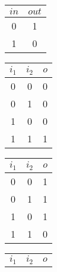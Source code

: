 \documentclass[../../main.tex]{subfiles}
\begin{document}
\begin{table}[H]
  \begin{minipage}[t]{0.166\textwidth}
    \begin{center}
      \begin{tabular}{|c|c|}
        \hline
        $in$ & $out$
        \\ \hline \hline
        0    & 1
        \\ \hline
        1    & 0
        \\ \hline
      \end{tabular}
    \end{center}
  \end{minipage}\hfill
  \begin{minipage}[t]{0.166\textwidth}
    \begin{center}
      \begin{tabular}{|c|c|c|}
        \hline
        $i_1$ & $i_2$ & $o$
        \\ \hline \hline
        0     & 0     & 0
        \\ \hline
        0     & 1     & 0
        \\ \hline
        1     & 0     & 0
        \\ \hline
        1     & 1     & 1
        \\ \hline
      \end{tabular}
    \end{center}
  \end{minipage}\hfill
  \begin{minipage}[t]{0.166\textwidth}
    \begin{center}
      \begin{tabular}{|c|c|c|}
        \hline
        $i_1$ & $i_2$ & $o$
        \\ \hline \hline
        0     & 0     & 1
        \\ \hline
        0     & 1     & 1
        \\ \hline
        1     & 0     & 1
        \\ \hline
        1     & 1     & 0
        \\ \hline
      \end{tabular}
    \end{center}
  \end{minipage}\hfill
  \begin{minipage}[t]{0.166\textwidth}
    \begin{center}
      \begin{tabular}{|c|c|c|}
        \hline
        $i_1$ & $i_2$ & $o$

\end{tabular}
\end{center}
\end{minipage}
\end{table}
\end{document}
